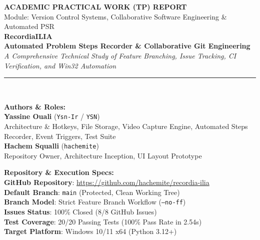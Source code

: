 \documentclass[10pt,a4paper]{article}
\begin{document}
\begin{center}
    {\small\textbf{\color{gray}ACADEMIC PRACTICAL WORK (TP) REPORT}}\\[0.2em]
    {\footnotesize\color{gray}Module: Version Control Systems, Collaborative Software Engineering \& Automated PSR}\\[1.5em]
    {\Huge\bfseries\color{primaryblue} RecordiaILIA}\\[0.4em]
    {\Large\bfseries\color{darkslate} Automated Problem Steps Recorder \& Collaborative Git Engineering}\\[0.3em]
    {\color{gray}\textit{A Comprehensive Technical Study of Feature Branching, Issue Tracking, CI Verification, and Win32 Automation}}\\[1em]
    \rule{\linewidth}{1.2pt}\\[1em]
\end{center}

\begin{minipage}[t]{0.48\textwidth}
    \textbf{Authors \& Roles:}\\[0.3em]
    \textbf{Yassine Ouali} (\texttt{Ysn-Ir} / \texttt{YSN})\\
    {\footnotesize\color{gray} Architecture \& Hotkeys, File Storage, Video Capture Engine, Automated Steps Recorder, Event Triggers, Test Suite}\\[0.4em]
    \textbf{Hachem Squalli} (\texttt{hachemite})\\
    {\footnotesize\color{gray} Repository Owner, Architecture Inception, UI Layout Prototype}
\end{minipage}
\hfill
\begin{minipage}[t]{0.48\textwidth}
    \textbf{Repository \& Execution Specs:}\\[0.3em]
    \textbf{GitHub Repository}: \url{https://github.com/hachemite/recordia-ilia}\\
    \textbf{Default Branch}: \texttt{main} (Protected, Clean Working Tree)\\
    \textbf{Branch Model}: Strict Feature Branch Workflow (\texttt{--no-ff})\\
    \textbf{Issues Status}: 100\% Closed (8/8 GitHub Issues)\\
    \textbf{Test Coverage}: 20/20 Passing Tests (100\% Pass Rate in 2.54s)\\
    \textbf{Target Platform}: Windows 10/11 x64 (Python 3.12+)
\end{minipage}
\end{document}
